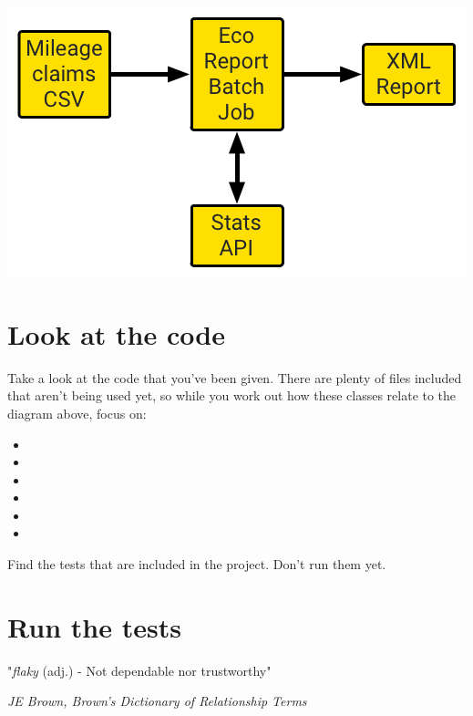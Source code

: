     \includegraphics[width=\textwidth]{images/batch-job-overview-diagram}

\section*{Look at the code}

Take a look at the code that you've been given. There are plenty of files included that aren't being used yet, so while you work out how these classes relate to the diagram above, focus on:

\begin{itemize}
    \item \texttt{\ShoutyReportJob}
    \item \texttt{\ShoutyReportProcessor}
    \item \texttt{\ShoutyStatsServiceException}
    \item \texttt{\UnitTests}
    \item \texttt{\EndToEndTests}
    \item \texttt{\MileageClaim}
\end{itemize}

Find the tests that are included in the project. Don't run them yet.



\section*{Run the tests}


\begin{framed}
    "\emph{flaky} (adj.) - Not dependable nor trustworthy"
    \begin{flushright}
        \textit{JE Brown, Brown's Dictionary of Relationship Terms}
    \end{flushright}
\end{framed}

